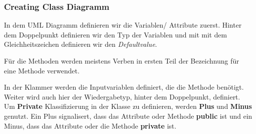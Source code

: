 \subsubsection{Creating Class Diagramm}
In dem UML Diagramm definieren wir die Variablen/ Attribute zuerst. Hinter dem Doppelpunkt definieren wir den Typ der Variablen und mit mit dem Gleichheitszeichen definieren wir den \textit{Defaultvalue}.\\
\begin{figure}[H]
	\centering
\end{figure} Für die Methoden werden meistens Verben in ersten Teil der Bezeichnung für eine Methode verwendet. 
\begin{figure}[H]
	\centering
\end{figure} In der Klammer werden die Inputvariablen definiert, die die Methode benötigt. Weiter wird auch hier der Wiedergabetyp, hinter dem Doppelpunkt, definiert.\\

Um \textbf{Private} Klassifizierung in der Klasse zu definieren, werden \textbf{Plus} und \textbf{Minus} genutzt. Ein Plus signalisert, dass das Attribute oder Methode \textbf{public} ist und ein Minus, dass das Attribute oder die Methode \textbf{private} ist.

\begin{figure}[H]
	\centering
\end{figure} 
